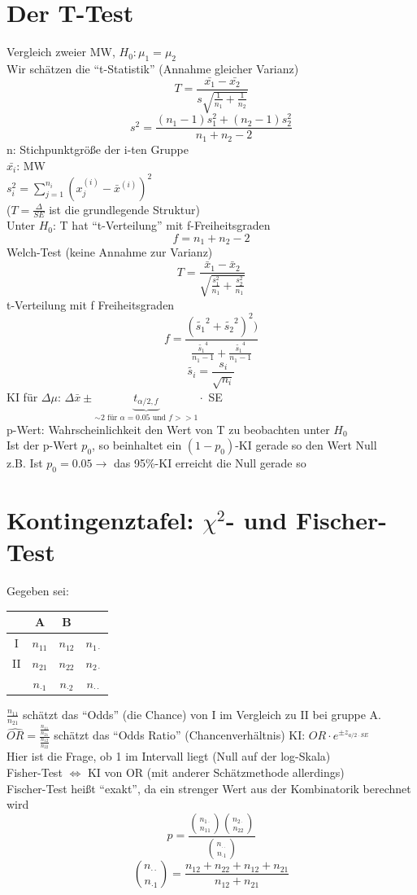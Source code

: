 \documentclass[10pt]{report}
\theoremstyle{definition}
\begin{document}
\section{Der T-Test}
Vergleich zweier MW, $H_0: \mu_1 = \mu_2$ \\
Wir schätzen die ``t-Statistik'' (Annahme gleicher Varianz) \\
\[ T = \frac{\bar{x_1} - \bar{x_2}}{s \sqrt{\frac{1}{n_1} + \frac{1}{n_2}}} \]
\[ s^2 = \frac{(n_1 - 1) s_1^2 + (n_2 -1) s_2^2}{n_1 + n_2 -2} \]
n: Stichpunktgröße der i-ten Gruppe \\
$\bar{x_i}$: MW \\
$s_i^2 = \sum\limits_{j=1}^{n_i} (x_j^{(i)} - \bar{x}^{(i)} )^2 $ \\
($T = \frac{\Delta}{SE}$ ist die grundlegende Struktur) \\
Unter $H_0$: T hat ``t-Verteilung'' mit f-Freiheitsgraden
\[ f= n_1 + n_2 -2 \]
Welch-Test (keine Annahme zur Varianz) \\
\[ T = \frac{\bar{x}_1 - \bar{x}_2 }{\sqrt{\frac{s_1^2}{n_1} + \frac{s_2^2}{n_1}}} \]
t-Verteilung mit f Freiheitsgraden
\[ f=\frac{(\tilde{s_1}^2 + \tilde{s_2}^2)^2)}{\frac{\tilde{s_1}^4}{n_1 - 1} + \frac{\tilde{s_1}^4}{n_1 - 1}} \]
\[ \tilde{s_i} = \frac{s_i}{\sqrt{n_i}} \]
KI für $\Delta \mu$: $\Delta \bar{x} \pm \underbrace{t_{\alpha / 2 , f}}_{\sim 2 \text{ für } \alpha=0.05 \text{ und } f >> 1}  \cdot$ SE \\
p-Wert: Wahrscheinlichkeit den Wert von T zu beobachten unter $H_0$ \\
Ist der p-Wert $p_0$, so beinhaltet ein $(1-p_0)$-KI gerade so den Wert Null \\
z.B. Ist $p_0=0.05 \rightarrow$ das 95\%-KI erreicht die Null gerade so

\section{Kontingenztafel: $\chi^2$- und Fischer-Test}
Gegeben sei:
\begin{tabular}{c|c|c|c}
	& A & B \\ \hline
	I & $n_{11}$ & $n_{12}$ & $n_{1\cdot}$ \\ \hline
	II & $n_{21}$ & $n_{22}$ & $n_{2\cdot}$ \\ \hline
	& $n_{\cdot1}$ & $n_{\cdot2}$ & $n_{\cdot\cdot}$
\end{tabular}
\newline
$\frac{n_{11}}{n_{21}}$ schätzt das ``Odds'' (die Chance) von I im Vergleich zu II bei gruppe A. $\widehat{OR}=\frac{\frac{n_{11}}{n_{21}}}{\frac{n_{12}}{n_{22}}}$ schätzt das ``Odds Ratio'' (Chancenverhältnis) KI: $OR \cdot e^{\pm z_{a/2 \cdot SE}}$ \\
Hier ist die Frage, ob 1 im Intervall liegt (Null auf der log-Skala)\\
Fisher-Test $\Leftrightarrow$ KI von OR (mit anderer Schätzmethode allerdings)  \\
Fischer-Test heißt ``exakt'', da ein strenger Wert aus der Kombinatorik berechnet wird
\[ p = \frac{\binom{n_{1\cdot}}{n_{11}} \binom{n_{2\cdot}}{n_{22}}}{ \binom{n_{\cdot \cdot}}{n_{\cdot1}}} \]
\[ \binom{n_{\cdot\cdot}}{n_{\cdot1}} = \frac{n_{12} + n_{22} + n_{12} + n_{21} }{n_{12} + n_{21} } \]
\end{document}
